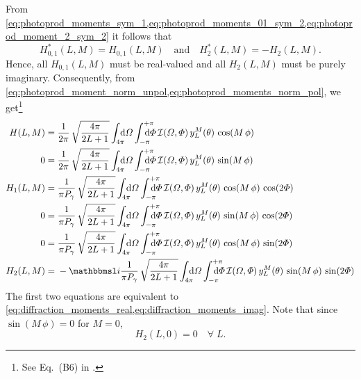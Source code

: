 From
\cref{eq:photoprod_moments_sym_1,eq:photoprod_moments_01_sym_2,eq:photoprod_moment_2_sym_2}
it follows that
\begin{equation}
  \label{eq:photoprodP_moments_real_imag}
  H_{0, 1}^*(L, M)
  = H_{0, 1}(L, M)
  \quad\text{and}\quad
  H_2^*(L, M)
  = -H_2(L, M).
\end{equation}
Hence, all $H_{0, 1}(L, M)$ must be real-valued and all $H_2(L, M)$
must be purely imaginary.  Consequently, from
\cref{eq:photoprod_moment_norm_unpol,eq:photoprod_moments_norm_pol},
we get\footnote{See Eq.~(B6) in .}
\begin{align}
  \label{eq:photoprod_moment_0_real}
  H(L, M)
  ={}& \frac{1}{2 \pi}\, \sqrt{\frac{4 \pi}{2 L + 1}} \int_{4 \pi}\!\!\!\! \dif{\Omega} \int_{-\pi}^{+\pi}\hspace{-1.2em} \dif{\Phi}\,
  \mathcal{I}(\Omega, \Phi)\, y_L^M(\theta)\, \cos(M\, \phi)
  \\
  \label{eq:photoprod_moment_0_imag}
  0
  ={}& \frac{1}{2 \pi}\, \sqrt{\frac{4 \pi}{2 L + 1}} \int_{4 \pi}\!\!\!\! \dif{\Omega} \int_{-\pi}^{+\pi}\hspace{-1.2em} \dif{\Phi}\,
  \mathcal{I}(\Omega, \Phi)\, y_L^M(\theta)\, \sin(M\, \phi)
  \\
  \label{eq:photoprod_moment_1_real}
  H_1(L, M)
  ={}& \frac{1}{\pi P_\gamma}\, \sqrt{\frac{4 \pi}{2 L + 1}} \int_{4 \pi}\!\!\!\! \dif{\Omega} \int_{-\pi}^{+\pi}\hspace{-1.2em} \dif{\Phi}\,
  \mathcal{I}(\Omega, \Phi)\, y_L^M(\theta)\, \cos(M\, \phi)\, \cos(2 \Phi)
  \\
  \label{eq:photoprod_moment_1_imag}
  0
  ={}& \frac{1}{\pi P_\gamma}\, \sqrt{\frac{4 \pi}{2 L + 1}} \int_{4 \pi}\!\!\!\! \dif{\Omega} \int_{-\pi}^{+\pi}\hspace{-1.2em} \dif{\Phi}\,
  \mathcal{I}(\Omega, \Phi)\, y_L^M(\theta)\, \sin(M\, \phi)\, \cos(2 \Phi)
  \\
  \label{eq:photoprod_moment_2_real}
  0
  ={}& \frac{1}{\pi P_\gamma}\, \sqrt{\frac{4 \pi}{2 L + 1}} \int_{4 \pi}\!\!\!\! \dif{\Omega} \int_{-\pi}^{+\pi}\hspace{-1.2em} \dif{\Phi}\,
  \mathcal{I}(\Omega, \Phi)\, y_L^M(\theta)\, \cos(M\, \phi)\, \sin(2 \Phi)
  \\
  \label{eq:photoprod_moment_2_imag}
  H_2(L, M)
  ={}& -\imag \frac{1}{\pi P_\gamma}\, \sqrt{\frac{4 \pi}{2 L + 1}} \int_{4 \pi}\!\!\!\! \dif{\Omega} \int_{-\pi}^{+\pi}\hspace{-1.2em} \dif{\Phi}\,
  \mathcal{I}(\Omega, \Phi)\, y_L^M(\theta)\, \sin(M\, \phi)\, \sin(2 \Phi)
\end{align}
The first two equations are equivalent to
\cref{eq:diffraction_moments_real,eq:diffraction_moments_imag}.  Note
that since $\sin(M\, \phi) = 0$ for $M = 0$,
\begin{equation}
  \label{eq:photoprod_moment_2_M0}
  H_2(L, 0) = 0
  \quad\forall\; L.
\end{equation}

